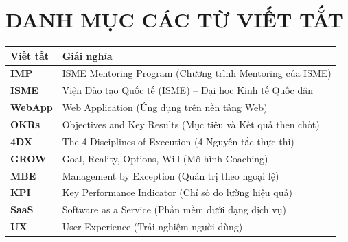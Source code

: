 \chapter*{DANH MỤC CÁC TỪ VIẾT TẮT}

\begin{tabularx}{\textwidth}{l X}
\toprule
\textbf{Viết tắt} & \textbf{Giải nghĩa} \\
\midrule
\textbf{IMP} & ISME Mentoring Program (Chương trình Mentoring của ISME) \\
\textbf{ISME} & Viện Đào tạo Quốc tế (ISME) -- Đại học Kinh tế Quốc dân \\
\textbf{WebApp} & Web Application (Ứng dụng trên nền tảng Web) \\
\textbf{OKRs} & Objectives and Key Results (Mục tiêu và Kết quả then chốt) \\
\textbf{4DX} & The 4 Disciplines of Execution (4 Nguyên tắc thực thi) \\
\textbf{GROW} & Goal, Reality, Options, Will (Mô hình Coaching) \\
\textbf{MBE} & Management by Exception (Quản trị theo ngoại lệ) \\
\textbf{KPI} & Key Performance Indicator (Chỉ số đo lường hiệu quả) \\
\textbf{SaaS} & Software as a Service (Phần mềm dưới dạng dịch vụ) \\
\textbf{UX} & User Experience (Trải nghiệm người dùng) \\
\bottomrule
\end{tabularx}

